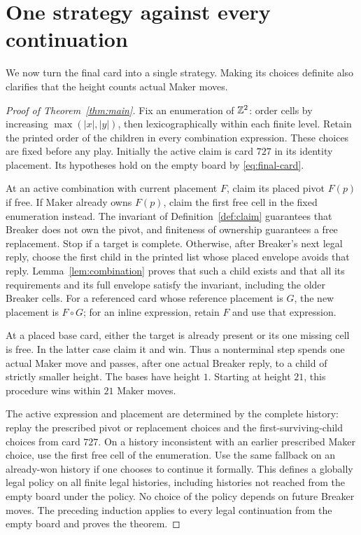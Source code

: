 \section{One strategy against every continuation}\label{sec:strategy}

We now turn the final card into a single strategy. Making its choices
definite also clarifies that the height counts actual Maker moves.

\begin{proof}[Proof of Theorem~\ref{thm:main}]
Fix an enumeration of $\mathbb Z^2$: order cells by increasing
$\max(|x|,|y|)$, then lexicographically within each finite level. Retain the printed order of the children in every
combination expression. These choices are fixed before any play.
Initially the active claim is card $727$ in its identity placement.
Its hypotheses hold on the empty board by
\eqref{eq:final-card}.

At an active combination with current placement $F$, claim its
placed pivot $F(p)$ if free. If Maker already owns $F(p)$, claim
the first free cell in the fixed enumeration instead. The invariant
of Definition~\ref{def:claim} guarantees that Breaker does not own
the pivot, and finiteness of ownership guarantees a free replacement.
Stop if a target is complete. Otherwise, after Breaker's next legal
reply, choose the first child in the printed list whose placed
envelope avoids that reply. Lemma~\ref{lem:combination} proves that
such a child exists and that all its requirements and its full
envelope satisfy the invariant, including the older Breaker cells.
For a referenced card whose reference placement is $G$, the new
placement is $F\circ G$; for an inline expression, retain $F$ and
use that expression.

At a placed base card, either the target is already present or its
one missing cell is free. In the latter case claim it and win.
Thus a nonterminal step spends one actual Maker move and passes,
after one actual Breaker reply, to a child of strictly smaller
height. The bases have height $1$. Starting at height $21$, this
procedure wins within $21$ Maker moves.

The active expression and placement are determined by the complete
history: replay the prescribed pivot or replacement choices and
the first-surviving-child choices from card $727$.
On a history inconsistent with an earlier prescribed Maker choice,
use the first free cell of the enumeration. Use the same fallback
on an already-won history if one chooses to continue it formally.
This defines a globally legal policy on all finite legal histories,
including histories not reached from the empty board under the
policy. No choice of the policy depends on future Breaker moves.
The preceding induction applies to every legal continuation from
the empty board and proves the theorem.
\end{proof}


